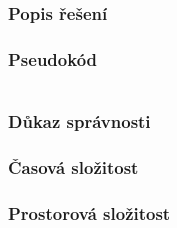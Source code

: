 \documentclass[11pt,a4paper]{article}
\begin{document}
\part*{}
\section{Popis řešení}

\section{Pseudokód}
\begin{verbatim}
\end{verbatim}

\section{Důkaz správnosti}

\section{Časová složitost}

\section{Prostorová složitost}
\end{document}
